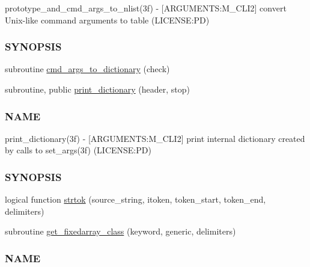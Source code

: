 \begin{DoxyCompactItemize}
\begin{DoxyCompactList}
prototype\+\_\+and\+\_\+cmd\+\_\+args\+\_\+to\+\_\+nlist(3f) -\/ \mbox{[}A\+R\+G\+U\+M\+E\+N\+TS\+:M\+\_\+\+C\+L\+I2\mbox{]} convert Unix-\/like command arguments to table (L\+I\+C\+E\+N\+SE\+:PD) \subsubsection*{S\+Y\+N\+O\+P\+S\+IS}\end{DoxyCompactList}\item 
subroutine \mbox{\hyperlink{namespacem__cli2_a3348b0c76dadd62c536e06f82bcb0331}{cmd\+\_\+args\+\_\+to\+\_\+dictionary}} (check)
\item 
subroutine, public \mbox{\hyperlink{namespacem__cli2_af7dc9c4b19e394533df4a8ef42fa111b}{print\+\_\+dictionary}} (header, stop)
\begin{DoxyCompactList}\small\item\em \subsubsection*{N\+A\+ME}

print\+\_\+dictionary(3f) -\/ \mbox{[}A\+R\+G\+U\+M\+E\+N\+TS\+:M\+\_\+\+C\+L\+I2\mbox{]} print internal dictionary created by calls to set\+\_\+args(3f) (L\+I\+C\+E\+N\+SE\+:PD) \subsubsection*{S\+Y\+N\+O\+P\+S\+IS}\end{DoxyCompactList}\item 
logical function \mbox{\hyperlink{namespacem__cli2_a752fd074abce57e636e4572b3e55db3a}{strtok}} (source\+\_\+string, itoken, token\+\_\+start, token\+\_\+end, delimiters)
\item 
subroutine \mbox{\hyperlink{namespacem__cli2_a6d8c1c441ac15f9a2882e50459d39565}{get\+\_\+fixedarray\+\_\+class}} (keyword, generic, delimiters)
\begin{DoxyCompactList}\small\item\em \subsubsection*{N\+A\+ME}


\end{DoxyCompactList}
\end{DoxyCompactItemize}
